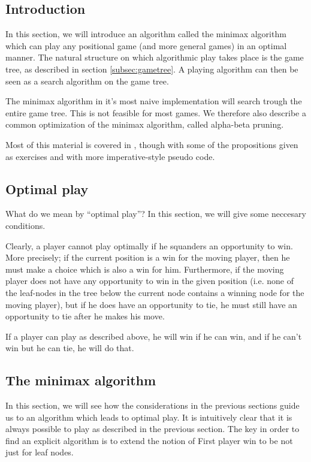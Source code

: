 \subsection{Introduction}

In this section, we will introduce an algorithm called the minimax algorithm which can play any positional game (and more general games) in an optimal manner.
The natural structure on which algorithmic play takes place is the game tree, as described in section \ref{subsec:gametree}.
A playing algorithm can then be seen as a search algorithm on the game tree.

The minimax algorithm in it's most naive implementation will search trough the entire game tree. This is not feasible for most games.
We therefore also describe a common optimization of the minimax algorithm, called alpha-beta pruning.


Most of this material is covered in \citep{aimodernapproach}, though with some of the propositions given as exercises and with more imperative-style pseudo code.

\subsection{Optimal play}
\label{sec:optimal_play}

What do we mean by ``optimal play''?
In this section, we will give some neccesary conditions.

Clearly, a player cannot play optimally if he squanders an opportunity to win.
More precisely; if the current position is a win for the moving player, then he must make a choice which is also a win for him.
Furthermore, if the moving player does not have any opportunity to win in the given position (i.e. none of the leaf-nodes in the tree below the current node contains a winning node for the moving player), but if he does have an opportunity to tie, he must still have an opportunity to tie after he makes his move.

If a player can play as described above, he will win if he can win, and if he can't win but he can tie, he will do that.

\subsection{The minimax algorithm}
\label{sec:minimax}

In this section, we will see how the considerations in the previous sections guide us to an algorithm which leads to optimal play.
It is intuitively clear that it is always possible to play as described in the previous section.
The key in order to find an explicit algorithm is to extend the notion of First player win to be not just for leaf nodes.

